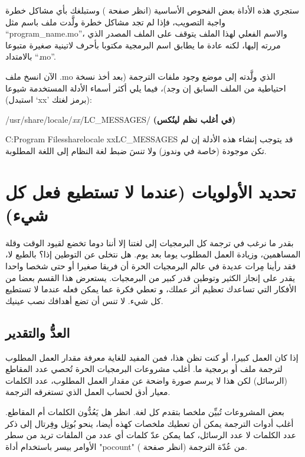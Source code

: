 ستجري هذه الأداة بعض الفحوص الأساسية (انظر صفحة
) وستبلغك بأي مشاكل خطرة واجبة التصويب، فإذا
لم تجد مشاكل خطرة ولَّدت ملف باسم مثل “program\_name.mo”، والاسم الفعلي
لهذا الملف يتوقف على الملف المصدر الذي مررته إليها، لكنه عادة ما يطابق
اسم البرمجية مكتوبا بأحرف لاتينية صغيرة متبوعا بالامتداد “‪.mo‬”.

الآن انسخ ملف ‪.mo‬ الذي ولَّدته إلى موضع وجود ملفات الترجمة (بعد أخذ
نسخة احتياطية من الملف السابق إن وجد)، فيما يلي أكثر أسماء الأدلة
المستخدمة شيوعا (استبدل ‘xx’ برمز لغتك):

\startitemize[1]
\item /usr/share/locale/{\it xx}/LC\_MESSAGES/ {\bf (في أغلب نظم
لينُكس)}
\item C: Program Files share locale
xx LC\_MESSAGES
\stopitemize
قد يتوجب إنشاء هذه الأدلة إن لم تكن موجودة (خاصة في وندوز) ولا تنسَ ضبط
لغة النظام إلى اللغة المطلوبة.

\section{تحديد الأولويات (عندما لا تستطيع فعل كل شيء)}
بقدر ما نرغب في ترجمة كل البرمجيات
إلى لغتنا إلا أننا دوما تخضع لقيود الوقت وقلة المساهمين، وزيادة العمل
المطلوب يوما بعد يوم. هل نتخلى عن التوطين إذا؟ بالطبع لا، فقد رأينا
مِرات عديدة في عالم البرمجيات الحرة أن فريقا صغيرا أو حتى شخصا واحدا
يقدر على إنجاز الكثير وتوطين قدر كبير من البرمجيات. يستعرض هذا القسم
بعضا من الأفكار التي تساعدك تعظيم أثر عملك، و تعطي فكرة عما يمكن فعله
عندما لا تستطيع كل شيء. لا تنس أن تضع أهدافك نصب عينيك.

\subsection{العدُّ والتقدير}
إذا كان العمل كبيرا، أو كنت تظن
هذا، فمن المفيد للغاية معرفة مقدار العمل المطلوب لترجمة ملف أو برمجية
ما. أغلب مشروعات البرمجيات الحرة تُحصي عدد المقاطع (الرسائل) لكن هذا لا
يرسم صورة واضحة عن مقدار العمل المطلوب، عدد الكلمات معيار أدق لحساب
العمل الذي تستغرقه الترجمة.

بعض المشروعات تُبيِّن ملخصا بتقدم كل لغة. انظر هل يَعُدُّون الكلمات أم
المقاطع. أغلب أدوات الترجمة يمكن أن تعطيك ملخصات كهذه أيضا، ينحو بُوتِل
وفِرتال إلى ذكر عدد الكلمات لا عدد الرسائل، كما يمكن عدّ كلمات أي عدد
من الملفات تريد من سطر الأوامر بيسر باستخدام أداة "pocount" من عُدّة
الترجمة (انظر صفحة ). 

